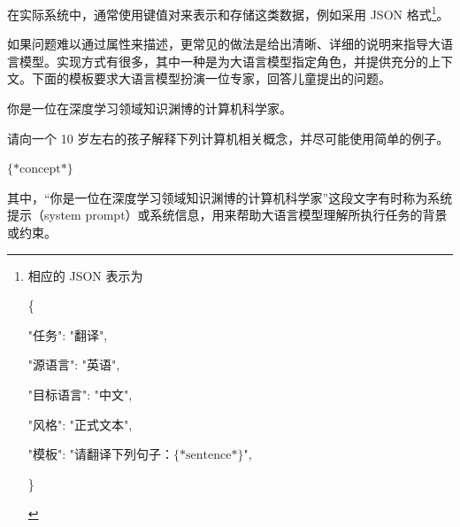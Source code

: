 \noindent 在实际系统中，通常使用键值对来表示和存储这类数据，例如采用 JSON 格式\footnote{
相应的 JSON 表示为

\vspace{0.5em}
\begin{tcolorbox}

\{

\hspace{2em} "任务": "翻译",

\hspace{2em} "源语言": "英语",

\hspace{2em} "目标语言": "中文",

\hspace{2em} "风格": "正式文本",

\hspace{2em} "模板": "请翻译下列句子：$\{*\mathrm{sentence}*\}$",

\}

\end{tcolorbox}
\vspace{0.5em}

}。

如果问题难以通过属性来描述，更常见的做法是给出清晰、详细的说明来指导大语言模型。实现方式有很多，其中一种是为大语言模型指定角色，并提供充分的上下文。下面的模板要求大语言模型扮演一位专家，回答儿童提出的问题。

\vspace{0.5em}
\begin{tcolorbox}

\begingroup
\setlength{\leftskip}{2em}
\setlength{\rightskip}{2em}

你是一位在深度学习领域知识渊博的计算机科学家。

\vspace{0.3em}

请向一个 10 岁左右的孩子解释下列计算机相关概念，并尽可能使用简单的例子。

\vspace{0.3em}

$\{*\mathrm{concept}*\}$

\vspace{0.3em}

\underline{\hspace{2em}}

\endgroup
\end{tcolorbox}
\vspace{0.5em}

\noindent 其中，“你是一位在深度学习领域知识渊博的计算机科学家”这段文字有时称为系统提示（system prompt）或系统信息，用来帮助大语言模型理解所执行任务的背景或约束。

